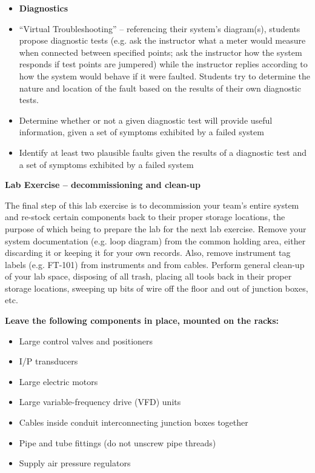 \filbreak

\begin{itemize}
\item{} {\bf Diagnostics}
\item{} ``Virtual Troubleshooting'' -- referencing their system's diagram(s), students propose diagnostic tests (e.g. ask the instructor what a meter would measure when connected between specified points; ask the instructor how the system responds if test points are jumpered) while the instructor replies according to how the system would behave if it were faulted.  Students try to determine the nature and location of the fault based on the results of their own diagnostic tests.
\item{} Determine whether or not a given diagnostic test will provide useful information, given a set of symptoms exhibited by a failed system
\item{} Identify at least two plausible faults given the results of a diagnostic test and a set of symptoms exhibited by a failed system
\end{itemize}



\vfil \eject

\noindent
{\bf Lab Exercise -- decommissioning and clean-up}

\vskip 5pt

The final step of this lab exercise is to decommission your team's entire system and re-stock certain components back to their proper storage locations, the purpose of which being to prepare the lab for the next lab exercise.  Remove your system documentation (e.g. loop diagram) from the common holding area, either discarding it or keeping it for your own records.  Also, remove instrument tag labels (e.g. FT-101) from instruments and from cables.  Perform general clean-up of your lab space, disposing of all trash, placing all tools back in their proper storage locations, sweeping up bits of wire off the floor and out of junction boxes, etc.

\vskip 10pt

\indent
{\bf Leave the following components in place, mounted on the racks:}

\begin{itemize}
\item{} Large control valves and positioners
\item{} I/P transducers
\item{} Large electric motors
\item{} Large variable-frequency drive (VFD) units
\item{} Cables inside conduit interconnecting junction boxes together
\item{} Pipe and tube fittings (do not unscrew pipe threads)
\item{} Supply air pressure regulators
\end{itemize}

